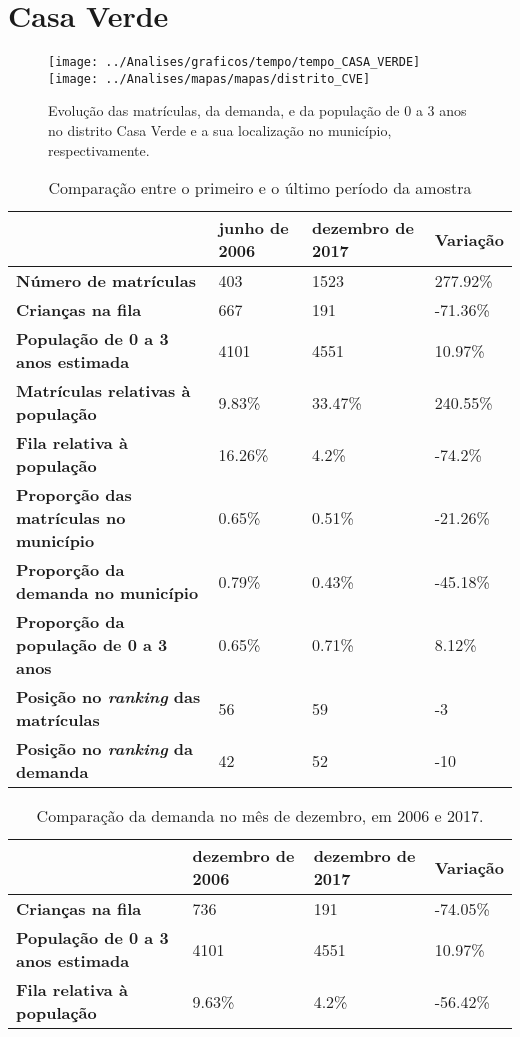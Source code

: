 \section{Casa Verde}
\begin{figure}[H]
\centering
\texttt{[image: ../Analises/graficos/tempo/tempo\_CASA\_VERDE]}
\texttt{[image: ../Analises/mapas/mapas/distrito\_CVE]}
\caption{Evolução das matrículas, da demanda, e da população de 0 a 3 anos no distrito Casa Verde e a sua localização no município, respectivamente.}
\end{figure}
\begin{table}[H]
\begin{tabular}{l|l|l|l}
\textbf{}                                      & \textbf{junho de 2006}       & \textbf{dezembro de 2017}    & \textbf{Variação} \\ \hline
\textbf{Número de matrículas}                  & 403 & 1523 & 277.92\% \\ \hline
\textbf{Crianças na fila}                      & 667 & 191 & -71.36\% \\ \hline
\textbf{População de 0 a 3 anos estimada}      & 4101 & 4551 & 10.97\% \\ \hline
\textbf{Matrículas relativas à população}      & 9.83\% & 33.47\% & 240.55\% \\ \hline
\textbf{Fila relativa à população}             & 16.26\% & 4.2\% & -74.2\% \\ \hline
\textbf{Proporção das matrículas no município} & 0.65\% & 0.51\% & -21.26\% \\ \hline
\textbf{Proporção da demanda no município}     & 0.79\% & 0.43\% & -45.18\% \\ \hline
\textbf{Proporção da população de 0 a 3 anos}  & 0.65\% & 0.71\% & 8.12\% \\ \hline
\textbf{Posição no \textit{ranking} das matrículas}     & 56 & 59 & -3 \\ \hline
\textbf{Posição no \textit{ranking} da demanda}         & 42 & 52 & -10 \\ 
\end{tabular}
\caption{Comparação entre o primeiro e o último período da amostra}
\end{table}
\begin{table}[H]
\begin{tabular}{l|l|l|l}
\textbf{}                                 & \textbf{dezembro de 2006} & \textbf{dezembro de 2017} & \textbf{Variação} \\ \hline
\textbf{Crianças na fila}                      & 736 & 191 & -74.05\% \\ \hline
\textbf{População de 0 a 3 anos estimada}      & 4101 & 4551 & 10.97\% \\ \hline
\textbf{Fila relativa à população}             & 9.63\% & 4.2\% & -56.42\% \\
\end{tabular}
\caption{Comparação da demanda no mês de dezembro, em 2006 e 2017.}
\end{table}
